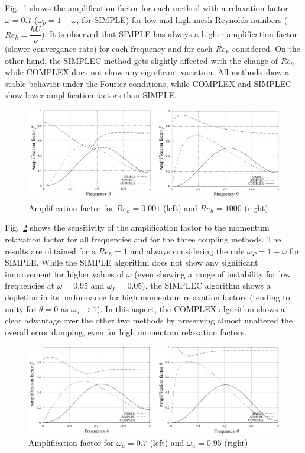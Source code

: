 \documentclass[final,3p,times,11pt,onecolumn]{myElsarticle}
\numberwithin{equation}{section}
\begin{document}
Fig.~\ref{fig:1a} shows the amplification factor for each method with a relaxation factor $\omega=0.7$ ($\omega_p=1-\omega$, for SIMPLE) for low and high mesh-Reynolds numbers ($Re_h = \dfrac{h U}{\nu}$). It is observed that SIMPLE has always a higher amplification factor (slower convergance rate) for each frequency and for each $Re_h$ considered. On the other hand, the SIMPLEC method gets slightly affected with the change of $Re_h$ while COMPLEX does not show any significant variation. All methods show a stable behavior under the Fourier conditions, while COMPLEX and SIMPLEC show lower amplification factors than SIMPLE. 

\begin{figure}[t!!]
    \centering
    \includegraphics[width=\textwidth]{fig/Re_fourier.pdf}
    \caption{Amplification factor for $Re_h=0.001$ (left) and $Re_h=1000$ (right)}
    \label{fig:1a}
\end{figure}
    
Fig.~\ref{fig:1b} shows the sensitivity of the amplification factor to the momentum relaxation factor for all frequencies and for the three coupling methods. The results are obtained for a $Re_h=1$ and always considering the rule $\omega_P = 1 - \omega$ for SIMPLE. While the SIMPLE algorithm does not show any significant improvement for higher values of $\omega$ (even showing a range of instability for low frequencies at $\omega=0.95$ and $\omega_P=0.05$), the SIMPLEC algorithm shows a depletion in its performance for high momentum relaxation factors (tending to unity for $\theta=0$ as $\omega_u \rightarrow 1$). In this aspect, the COMPLEX algorithm shows a clear advantage over the other two methods by preserving almost unaltered the overall error damping, even for high momentum relaxation factors.     
    
\begin{figure}[t!!]
    \centering
    \includegraphics[width=\textwidth]{fig/w_fourier.pdf}
    \caption{Amplification factor for $\omega_u=0.7$ (left) and $\omega_u=0.95$ (right)}
    \label{fig:1b}
\end{figure}    
\end{document}
